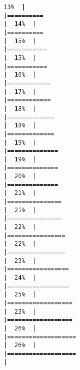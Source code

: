 \documentclass[
]{article}
\begin{document}
\begin{verbatim}
13%  |                                                                              |==========                                                            |  14%  |                                                                              |==========                                                            |  15%  |                                                                              |===========                                                           |  15%  |                                                                              |===========                                                           |  16%  |                                                                              |============                                                          |  17%  |                                                                              |============                                                          |  18%  |                                                                              |=============                                                         |  18%  |                                                                              |=============                                                         |  19%  |                                                                              |==============                                                        |  19%  |                                                                              |==============                                                        |  20%  |                                                                              |==============                                                        |  21%  |                                                                              |===============                                                       |  21%  |                                                                              |===============                                                       |  22%  |                                                                              |================                                                      |  22%  |                                                                              |================                                                      |  23%  |                                                                              |=================                                                     |  24%  |                                                                              |=================                                                     |  25%  |                                                                              |==================                                                    |  25%  |                                                                              |==================                                                    |  26%  |                                                                              |===================                                                   |  26%  |                                                                              |===================                                                   |  
\end{verbatim}
\end{document}
